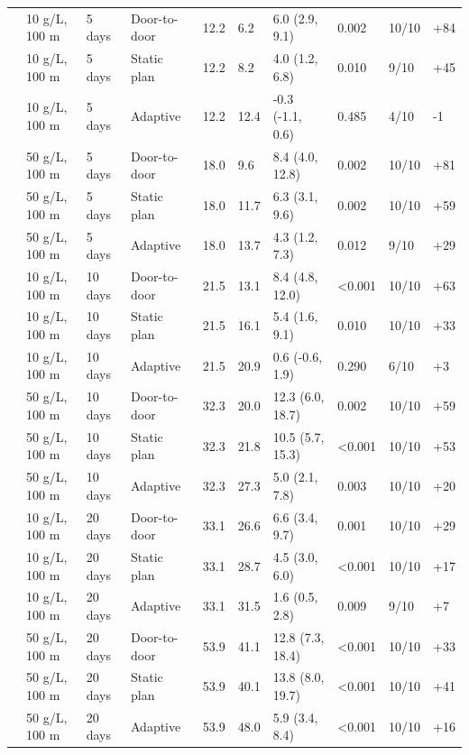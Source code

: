 \documentclass[sustainability,article,submit,pdftex,moreauthors]{Definitions/mdpi}
\begin{document}
{\begin{longtable}{L{3.0cm}L{2.0cm}L{1.0cm}L{1.6cm}R{1.0cm}R{1.4cm}L{2.4cm}R{0.9cm}R{0.8cm}R{0.9cm}}
 & 10 \textmu{}g/L, 100 m & 5 days & Door-to-door & 12.2 & 6.2 & 6.0 (2.9, 9.1) & 0.002 & 10/10 & +84 \\
 & 10 \textmu{}g/L, 100 m & 5 days & Static plan & 12.2 & 8.2 & 4.0 (1.2, 6.8) & 0.010 & 9/10 & +45 \\
 & 10 \textmu{}g/L, 100 m & 5 days & Adaptive & 12.2 & 12.4 & -0.3 (-1.1, 0.6) & 0.485 & 4/10 & -1 \\
 & 50 \textmu{}g/L, 100 m & 5 days & Door-to-door & 18.0 & 9.6 & 8.4 (4.0, 12.8) & 0.002 & 10/10 & +81 \\
 & 50 \textmu{}g/L, 100 m & 5 days & Static plan & 18.0 & 11.7 & 6.3 (3.1, 9.6) & 0.002 & 10/10 & +59 \\
 & 50 \textmu{}g/L, 100 m & 5 days & Adaptive & 18.0 & 13.7 & 4.3 (1.2, 7.3) & 0.012 & 9/10 & +29 \\
 & 10 \textmu{}g/L, 100 m & 10 days & Door-to-door & 21.5 & 13.1 & 8.4 (4.8, 12.0) & <0.001 & 10/10 & +63 \\
 & 10 \textmu{}g/L, 100 m & 10 days & Static plan & 21.5 & 16.1 & 5.4 (1.6, 9.1) & 0.010 & 10/10 & +33 \\
 & 10 \textmu{}g/L, 100 m & 10 days & Adaptive & 21.5 & 20.9 & 0.6 (-0.6, 1.9) & 0.290 & 6/10 & +3 \\
 & 50 \textmu{}g/L, 100 m & 10 days & Door-to-door & 32.3 & 20.0 & 12.3 (6.0, 18.7) & 0.002 & 10/10 & +59 \\
 & 50 \textmu{}g/L, 100 m & 10 days & Static plan & 32.3 & 21.8 & 10.5 (5.7, 15.3) & <0.001 & 10/10 & +53 \\
 & 50 \textmu{}g/L, 100 m & 10 days & Adaptive & 32.3 & 27.3 & 5.0 (2.1, 7.8) & 0.003 & 10/10 & +20 \\
 & 10 \textmu{}g/L, 100 m & 20 days & Door-to-door & 33.1 & 26.6 & 6.6 (3.4, 9.7) & 0.001 & 10/10 & +29 \\
 & 10 \textmu{}g/L, 100 m & 20 days & Static plan & 33.1 & 28.7 & 4.5 (3.0, 6.0) & <0.001 & 10/10 & +17 \\
 & 10 \textmu{}g/L, 100 m & 20 days & Adaptive & 33.1 & 31.5 & 1.6 (0.5, 2.8) & 0.009 & 9/10 & +7 \\
 & 50 \textmu{}g/L, 100 m & 20 days & Door-to-door & 53.9 & 41.1 & 12.8 (7.3, 18.4) & <0.001 & 10/10 & +33 \\
 & 50 \textmu{}g/L, 100 m & 20 days & Static plan & 53.9 & 40.1 & 13.8 (8.0, 19.7) & <0.001 & 10/10 & +41 \\
 & 50 \textmu{}g/L, 100 m & 20 days & Adaptive & 53.9 & 48.0 & 5.9 (3.4, 8.4) & <0.001 & 10/10 & +16 \\

\end{longtable}}
\end{document}
